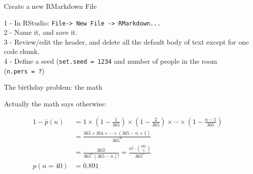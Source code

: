 \begin{frame}[fragile]{Create a new RMarkdown File}

1 - In RStudio:
\texttt{File-\textgreater{}\ New\ File\ -\textgreater{}\ RMarkdown...}\\
2 - Name it, and save it.\\
3 - Review/edit the header, and delete all the default body of text
except for one code chunk.\\
4 - Define a seed (\texttt{set.seed\ =\ 1234} and number of people in
the room (\texttt{n.pers\ =\ ?})

\end{frame}

\begin{frame}{The birthday problem: the math}

Actually the math says otherwise:

\begin{align} 
 1 - \bar p(n) &= 1 \times \left(1-\frac{1}{365}\right) \times \left(1-\frac{2}{365}\right) \times \cdots \times \left(1-\frac{n-1}{365}\right) \nonumber  \\  &= \frac{ 365 \times 364 \times \cdots \times (365-n+1) }{ 365^n } \nonumber \\ &= \frac{ 365! }{ 365^n (365-n)!} = \frac{n!\cdot\binom{365}{n}}{365^n}\\
p(n= 40) &= 0.891  \nonumber
\end{align}

\end{frame}

